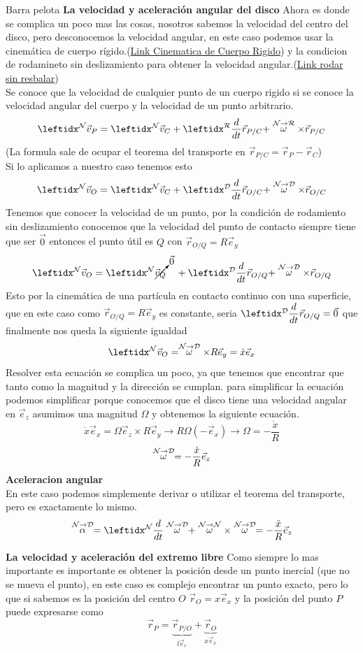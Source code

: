 \begin{solucion}{Barra pelota}
\textbf{La velocidad y aceleración angular del disco}
Ahora es donde se complica un poco mas las cosas, nosotros sabemos la velocidad del centro del disco, pero desconocemos la velocidad angular, en este caso podemos usar la cinemática de cuerpo rígido.(\href{https://dynref.engr.illinois.edu/rkg.html\#rkg-er}{Link Cinematica de Cuerpo Rigido}) y la condicion de rodamineto sin deslizamiento para obtener la velocidad angular.(\href{https://dynref.engr.illinois.edu/rko.html\#rko-wr}{Link rodar sin resbalar})\\
Se conoce que la velocidad de cualquier punto de un cuerpo rigido si se conoce la velocidad angular del cuerpo y la velocidad de un punto arbitrario.
$$\marc{\Vec{v}_P}{N}=\marc{{\Vec{v}_C}}{N} + \transporta{\Vec{r}_{P/C}}{N}{R}$$
(La formula sale de ocupar el teorema del transporte en $\vec{r}_{P/C}=\vec{r}_P-\vec{r}_C$)\\
Si lo aplicamos a nuestro caso tenemos esto
$$\marc{\Vec{v}_O}{N}=\marc{{\Vec{v}_C}}{N} + \transporta{\Vec{r}_{O/C}}{N}{D}$$
Tenemos que conocer la velocidad de un punto, por la condición de rodamiento sin deslizamiento conocemos que la velocidad del punto de contacto siempre tiene que ser $\vec{0}$ entonces el punto útil es $Q$ con $\vec{r}_{O/Q}=R\vec{e}_y$
$$\marc{\Vec{v}_O}{N}=\marc{\cancelto{\Vec{0}}{\Vec{v}_Q}}{N} \quad+ \transporta{\Vec{r}_{O/Q}}{N}{D}$$
Esto por la cinemática de una partícula en contacto continuo con una superficie, que en este caso como $\vec{r}_{O/Q}=R\vec{e}_y$ es constante, seria $\der{\vec{r}_{O/Q}}{D}=\vec{0}$
 que finalmente nos queda la siguiente igualdad
 $$\marc{}{N}{\vec{v}}_O=\velang{N}{D}\times R\vec{e}_y=\dot x\vec{e}_x$$
 Resolver esta ecuación se complica un poco, ya que tenemos que encontrar que tanto como la magnitud y la dirección se cumplan. para simplificar la ecuación podemos simplificar porque conocemos que el disco tiene una velocidad angular en $\vec e_z$ asumimos una magnitud $\Omega$ y obtenemos la siguiente ecuación.
 $$\dot x\vec e_x=\Omega\vec e_z\times R\vec e_y\longrightarrow R\Omega(-\vec{e}_x)\longrightarrow\Omega=-\dfrac{\dot x}{R}$$
 $$\stackrel{\mathcal{N} \to \mathcal{D}}{\omega}=-\dfrac{\dot x}{R}\vec{e}_z$$
 \textbf{Aceleracion angular}\\
 En este caso podemos simplemente derivar o utilizar el teorema del transporte, pero es exactamente lo mismo.
 $$\accang{N}{D}=\transporta{\velang{N}{D}}{N}{N}=-\dfrac{\ddot x}{R}\vec{e}_z$$
 

\textbf{La velocidad y aceleración del extremo libre}
        Como siempre lo mas importante es importante es obtener la posición desde un punto inercial (que no se  mueva el punto), en este caso es complejo encontrar un punto exacto, pero lo que si sabemos es la posición del centro $O$ $\vec{r}_O=x\vec{e}_x$ y la posición del punto $P$ puede expresarse como 
        $$\vec{r}_P=\underbrace{\vec{r}_{P/O}}_{l\vec{e}_r}+\underbrace{\vec{r}_O}_{x\vec{e}_x}$$


\end{solucion}
